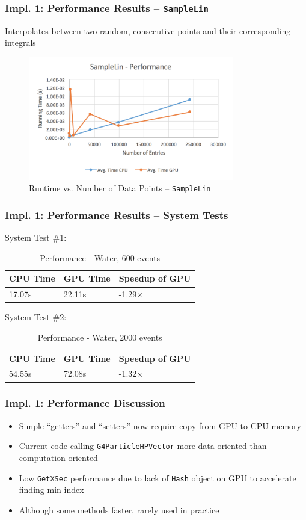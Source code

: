 \documentclass{beamer}
\begin{document}
\begin{frame}
\frametitle{Impl. 1: Performance Results -- \texttt{SampleLin}}
Interpolates between two random, consecutive points and their corresponding integrals
\begin{figure}
\centering
\includegraphics[width=0.8\textwidth]{images/samplelin_line.png}
\caption{Runtime vs. Number of Data Points -- \texttt{SampleLin}}
\end{figure}
\end{frame}

\begin{frame}
\frametitle{Impl. 1: Performance Results -- System Tests}
System Test \#1:
\begin{table}
	\begin{tabular}{lll}
	\toprule
	\bf CPU Time&\bf  GPU Time&\bf Speedup of GPU\\\midrule
	17.07s&22.11s&-1.29$\times$\\\bottomrule
	\end{tabular}
	\caption{Performance - Water, 600 events}
\end{table}
System Test \#2:
\begin{table}
	\begin{tabular}{lll}
	\toprule
	\bf CPU Time&\bf  GPU Time&\bf Speedup of GPU\\\midrule
	54.55s&72.08s&-1.32$\times$\\\bottomrule
	\end{tabular}
	\caption{Performance - Water, 2000 events}
\end{table}
\end{frame}

\begin{frame}
\frametitle{Impl. 1: Performance Discussion}
\begin{itemize}
\item Simple ``getters'' and ``setters'' now require copy from GPU to CPU memory
\item Current code calling \texttt{G4ParticleHPVector} more data-oriented than computation-oriented
\item Low \texttt{GetXSec} performance due to lack of \texttt{Hash} object on GPU to accelerate finding min index
\item Although some methods faster, rarely used in practice
\end{itemize}
\end{frame}
\end{document}

